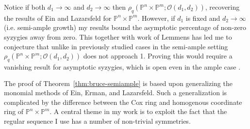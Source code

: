\documentclass[11pt,reqno]{amsart}
\theoremstyle{remark}
\renewcommand{\O}{\mathcal{O}}
\renewcommand{\P}{\mathbb{P}}
\begin{document}
Notice if both $d_{1}\to \infty$ and $d_{2}\to\infty$ then $\rho_{q}\left(\P^{n}\times\P^{m}; \O(d_1,d_2)\right)$, recovering the results of Ein and Lazarsfeld for $\P^n\times\P^m$. However, if $d_{1}$ is fixed and $d_{2}\to \infty$ (i.e. semi-ample growth) my results bound the asymptotic percentage of non-zero syzygies away from zero. This together with work of Lemmens \cite{lemmens18} has led me to conjecture that unlike in previously studied cases in the semi-ample setting $\rho_{q}\left(\P^{n}\times\P^{m}; \O(d_1,d_2)\right)$ does not approach 1. Proving this would require a vanishing result for asymptotic syzygies, which is open even in the ample case  \cite[Conjectures~7.1,~7.5]{einLazarsfeld12}.





The proof of Theorem~\ref{thm:bruce-semiample} is based upon generalizing the monomial methods of Ein, Erman, and Lazarsfeld. Such a generalization is complicated by the difference between the Cox ring and homogenous coordinate ring of $\P^{n}\times\P^{m}$. A central theme in my work is to exploit the fact that the regular sequence I use has a number of non-trivial symmetries. 
\end{document}
